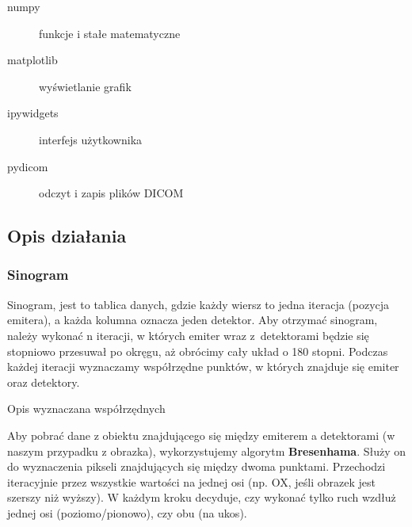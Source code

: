 \documentclass[polish,polish,a4paper]{article}
\begin{document}
			\begin{description}
				\item[numpy] funkcje i stałe matematyczne
				\item[matplotlib] wyświetlanie grafik
				\item[ipywidgets] interfejs użytkownika
				\item[pydicom] odczyt i zapis plików DICOM
			\end{description}
			
			\subsection{Opis działania}
				\subsubsection{Sinogram}
				
				Sinogram, jest to tablica danych, 
				gdzie każdy wiersz to jedna iteracja (pozycja emitera), 
				a każda kolumna oznacza jeden detektor.
				Aby otrzymać sinogram, należy wykonać n iteracji, 
				w których emiter wraz z~detektorami będzie się stopniowo przesuwał po okręgu, 
				aż obrócimy cały układ o 180 stopni. 
				Podczas każdej iteracji wyznaczamy współrzędne punktów, w których znajduje się emiter oraz detektory.
				
				{\color{red} Opis wyznaczana współrzędnych}
				
				Aby pobrać dane z obiektu znajdującego się między emiterem a detektorami (w naszym przypadku z obrazka), wykorzystujemy algorytm \textbf{Bresenhama}. Służy on do wyznaczenia pikseli znajdujących się między dwoma punktami. Przechodzi iteracyjnie przez wszystkie wartości na jednej osi (np. OX, jeśli obrazek jest szerszy niż wyższy). W każdym kroku decyduje, czy wykonać tylko ruch wzdłuż jednej osi (poziomo/pionowo), czy obu (na ukos).
				
\end{document}
